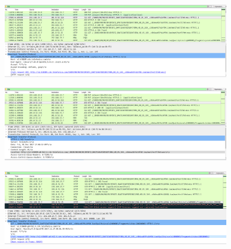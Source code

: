 \begin{figure}[h] 
\includegraphics[width=10cm]{Figuras/exemplo_vod_2.png} 
\label{figura:exemplo_vod_2}
\end{figure}

\begin{figure}[h] 
\includegraphics[width=10cm]{Figuras/exemplo_vod_3.png} 
\label{figura:exemplo_vod_3}
\end{figure}

\begin{figure}[h]
\includegraphics[width=10cm]{Figuras/exemplo_vod_4.png} 
\label{figura:exemplo_vod_4}
\end{figure}